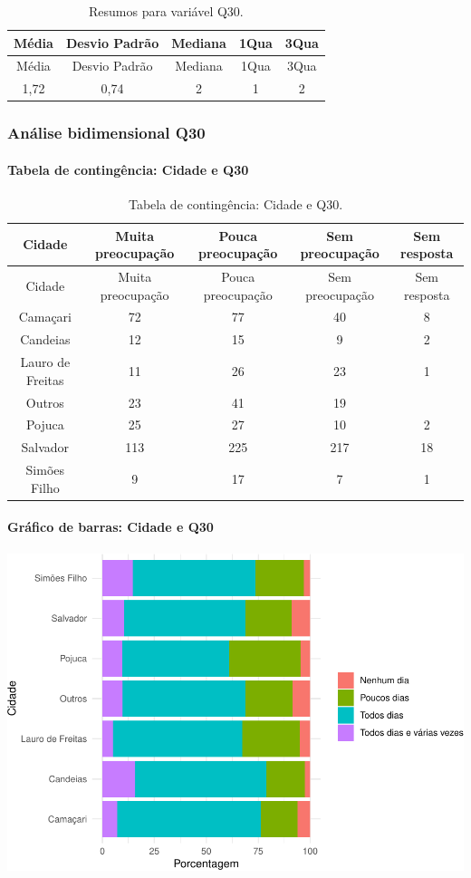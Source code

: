 \documentclass[]{article}
\let\oldparagraph\paragraph
\renewcommand{\paragraph}[1]{\oldparagraph{#1}\mbox{}}
\begin{document}
\begin{longtable}[]{@{}ccccc@{}}
\caption{\label{tab:unnamed-chunk-955}Resumos para variável Q30.}\tabularnewline
\toprule
Média & Desvio Padrão & Mediana & 1Qua & 3Qua\tabularnewline
\midrule
\endfirsthead
\toprule
Média & Desvio Padrão & Mediana & 1Qua & 3Qua\tabularnewline
\midrule
\endhead
1,72 & 0,74 & 2 & 1 & 2\tabularnewline
\bottomrule
\end{longtable}

\cleardoublepage

\hypertarget{anuxe1lise-bidimensional-q30}{%
\subsubsection{Análise bidimensional Q30}\label{anuxe1lise-bidimensional-q30}}

\hypertarget{tabela-de-continguxeancia-cidade-e-q30}{%
\paragraph{Tabela de contingência: Cidade e Q30}\label{tabela-de-continguxeancia-cidade-e-q30}}

\begin{longtable}[]{@{}ccccc@{}}
\caption{\label{tab:unnamed-chunk-956}Tabela de contingência: Cidade e Q30.}\tabularnewline
\toprule
Cidade & Muita preocupação & Pouca preocupação & Sem preocupação & Sem resposta\tabularnewline
\midrule
\endfirsthead
\toprule
Cidade & Muita preocupação & Pouca preocupação & Sem preocupação & Sem resposta\tabularnewline
\midrule
\endhead
Camaçari & 72 & 77 & 40 & 8\tabularnewline
Candeias & 12 & 15 & 9 & 2\tabularnewline
Lauro de Freitas & 11 & 26 & 23 & 1\tabularnewline
Outros & 23 & 41 & 19 &\tabularnewline
Pojuca & 25 & 27 & 10 & 2\tabularnewline
Salvador & 113 & 225 & 217 & 18\tabularnewline
Simões Filho & 9 & 17 & 7 & 1\tabularnewline
\bottomrule
\end{longtable}

\hypertarget{gruxe1fico-de-barras-cidade-e-q30}{%
\paragraph{Gráfico de barras: Cidade e Q30}\label{gruxe1fico-de-barras-cidade-e-q30}}

\begin{center}\includegraphics[width=0.75\linewidth]{relatorio_covid19_files/figure-latex/unnamed-chunk-957-1} \end{center}
\end{document}
